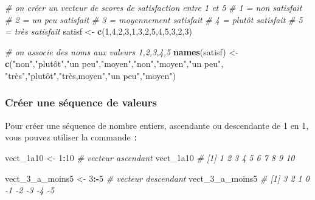 \documentclass[
]{book}
\newenvironment{Shaded}{\begin{snugshade}}{\end{snugshade}}
\newcommand{\CommentTok}[1]{\textcolor[rgb]{0.56,0.35,0.01}{\textit{#1}}}
\newcommand{\DecValTok}[1]{\textcolor[rgb]{0.00,0.00,0.81}{#1}}
\newcommand{\FunctionTok}[1]{\textcolor[rgb]{0.13,0.29,0.53}{\textbf{#1}}}
\newcommand{\NormalTok}[1]{#1}
\newcommand{\OtherTok}[1]{\textcolor[rgb]{0.56,0.35,0.01}{#1}}
\newcommand{\SpecialCharTok}[1]{\textcolor[rgb]{0.81,0.36,0.00}{\textbf{#1}}}
\newcommand{\StringTok}[1]{\textcolor[rgb]{0.31,0.60,0.02}{#1}}
\begin{document}
\begin{Shaded}
\begin{Highlighting}[]
\CommentTok{\# on créer un vecteur de scores de satisfaction entre 1 et 5}
\CommentTok{\# 1 = non satisfait}
\CommentTok{\# 2 = un peu satisfait}
\CommentTok{\# 3 = moyennement satisfait}
\CommentTok{\# 4 = plutôt satisfait}
\CommentTok{\# 5 = très satisfait}
\NormalTok{satisf }\OtherTok{\textless{}{-}} \FunctionTok{c}\NormalTok{(}\DecValTok{1}\NormalTok{,}\DecValTok{4}\NormalTok{,}\DecValTok{2}\NormalTok{,}\DecValTok{3}\NormalTok{,}\DecValTok{1}\NormalTok{,}\DecValTok{3}\NormalTok{,}\DecValTok{2}\NormalTok{,}\DecValTok{5}\NormalTok{,}\DecValTok{4}\NormalTok{,}\DecValTok{5}\NormalTok{,}\DecValTok{3}\NormalTok{,}\DecValTok{2}\NormalTok{,}\DecValTok{3}\NormalTok{)}

\CommentTok{\# on associe des noms aux valeurs 1,2,3,4,5}
\FunctionTok{names}\NormalTok{(satisf) }\OtherTok{\textless{}{-}} \FunctionTok{c}\NormalTok{(}\StringTok{"non"}\NormalTok{,}\StringTok{"plutôt"}\NormalTok{,}\StringTok{"un peu"}\NormalTok{,}\StringTok{"moyen"}\NormalTok{,}\StringTok{"non"}\NormalTok{,}\StringTok{"moyen"}\NormalTok{,}\StringTok{"un peu"}\NormalTok{,}
                   \StringTok{"très"}\NormalTok{,}\StringTok{"plutôt"}\NormalTok{,}\StringTok{"très,moyen"}\NormalTok{,}\StringTok{"un peu"}\NormalTok{,}\StringTok{"moyen"}\NormalTok{)}
\end{Highlighting}
\end{Shaded}

\subsubsection{Créer une séquence de valeurs}\label{cruxe9er-une-suxe9quence-de-valeurs}

Pour créer une séquence de nombre entiers, ascendante ou descendante de 1 en 1, vous pouvez utiliser la commande \texttt{:}

\begin{Shaded}
\begin{Highlighting}[]
\NormalTok{vect\_1a10 }\OtherTok{\textless{}{-}} \DecValTok{1}\SpecialCharTok{:}\DecValTok{10} \CommentTok{\# vecteur ascendant}
\NormalTok{vect\_1a10 }\CommentTok{\# [1]  1  2  3  4  5  6  7  8  9 10}

\NormalTok{vect\_3\_a\_moins5 }\OtherTok{\textless{}{-}} \DecValTok{3}\SpecialCharTok{:{-}}\DecValTok{5} \CommentTok{\# vecteur descendant}
\NormalTok{vect\_3\_a\_moins5 }\CommentTok{\# [1] 3  2  1  0 {-}1 {-}2 {-}3 {-}4 {-}5}
\end{Highlighting}
\end{Shaded}
\end{document}
